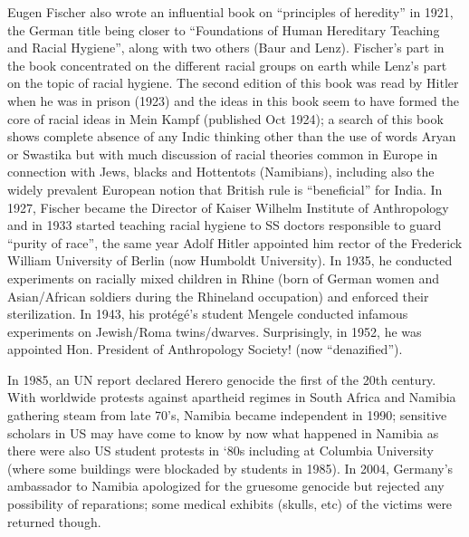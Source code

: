 Eugen Fischer also wrote an influential book on “principles of heredity” in 1921, the German title being closer to “Foundations of Human Hereditary Teaching and Racial Hygiene”, along with two others (Baur and Lenz).  Fischer’s part in the book concentrated on the different racial groups on earth while Lenz’s part on the topic of racial hygiene. The second edition of this book was read by Hitler when he was in prison (1923) and the ideas in this book seem to have formed the core of racial ideas in Mein Kampf (published Oct 1924); a search of this book shows complete absence of any Indic thinking other than the use of words Aryan or Swastika but with much  discussion of  racial theories common in Europe in connection with Jews, blacks and Hottentots (Namibians), including also the widely prevalent European notion that British rule is “beneficial” for India. In 1927, Fischer became the Director of Kaiser Wilhelm Institute of Anthropology and in 1933 started teaching racial hygiene to SS doctors responsible to guard “purity of race”, the same year Adolf Hitler appointed him rector of the Frederick William University of Berlin (now Humboldt University). In 1935, he conducted experiments on racially mixed children in Rhine (born of German women and Asian/African soldiers during the Rhineland occupation) and enforced their sterilization. In 1943, his protégé’s student Mengele conducted infamous experiments on Jewish/Roma twins/dwarves. Surprisingly, in 1952, he was appointed Hon. President of Anthropology Society! (now “denazified”).
\vskip 2pt

In 1985, an UN report declared Herero genocide the first of the 20th century. With worldwide protests against apartheid regimes in South Africa and Namibia gathering steam from late 70’s, Namibia became independent in 1990; sensitive scholars in US may have come to know by now what happened in Namibia as there were also US student protests in ‘80s including at Columbia University (where some buildings were blockaded by students in 1985). In 2004, Germany’s ambassador to Namibia apologized for the gruesome genocide but rejected any possibility of reparations; some medical exhibits (skulls, etc) of the victims were returned though.
\vskip 2pt

